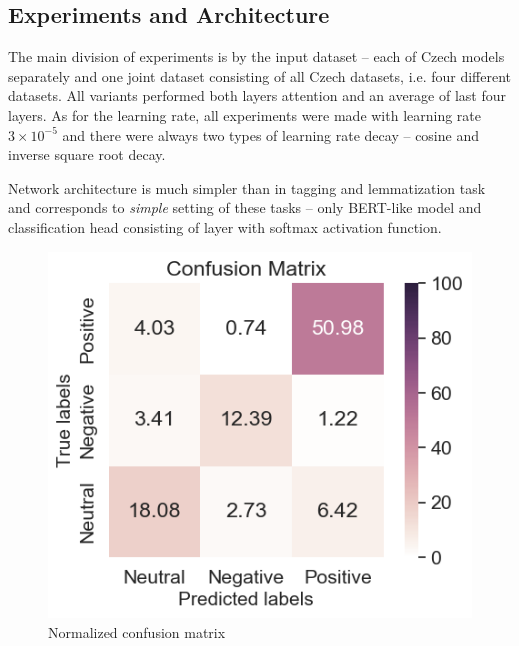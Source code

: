 

\subsection{Experiments and Architecture}
The main division of experiments is by the input dataset -- each of Czech models separately and one joint dataset consisting of all Czech datasets, i.e. four different datasets. All variants performed both layers attention and an average of last four layers. As for the learning rate, all experiments were made with learning rate $3 \times 10^{-5}$ and there were always two types of learning rate decay -- cosine and inverse square root decay. 
\par
Network architecture is much simpler than in tagging and lemmatization task and corresponds to \textit{simple} setting of these tasks -- only BERT-like model and classification head consisting of layer with softmax activation function. %

\begin{figure}[h]
\centering
\includegraphics[width=1\columnwidth]{../img/confusion_matrix}
\protect\caption{Normalized confusion matrix}
\label{pic:conf1}
\end{figure}

